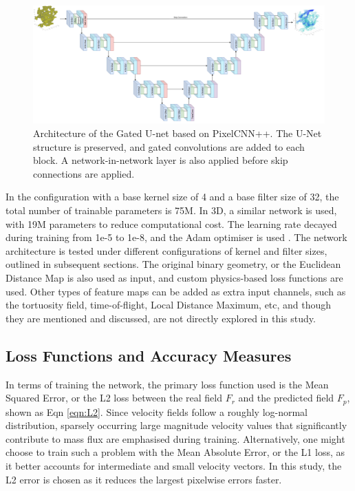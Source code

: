 \documentclass{article}
\begin{document}
\begin{figure}[htp!]
  \centering
    \includegraphics[width=\textwidth]{./figures/velCNNarch.png}
    \caption{Architecture of the Gated U-net based on PixelCNN++. The U-Net structure is preserved, and gated convolutions are added to each block. A network-in-network layer is also applied before skip connections are applied.}
    \label{fig:uresnet3d}
\end{figure}

In the configuration with a base kernel size of 4 and a base filter size of 32, the total number of trainable parameters is 75M. In 3D, a similar network is used, with 19M parameters to reduce computational cost. The learning rate decayed during training from 1e-5 to 1e-8, and the Adam optimiser is used \cite{AdamKingma}. The network architecture is tested under different configurations of kernel and filter sizes, outlined in subsequent sections. The original binary geometry, or the Euclidean Distance Map is also used as input, and custom physics-based loss functions are used. Other types of feature maps can be added as extra input channels, such as the tortuosity field, time-of-flight, Local Distance Maximum, etc, and though they are mentioned and discussed, are not directly explored in this study.

\subsection{Loss Functions and Accuracy Measures}
\label{sec:accuracy}

In terms of training the network, the primary loss function used is the Mean Squared Error, or the L2 loss between the real field $F_{r}$ and the predicted field $F_{p}$, shown as Eqn \ref{eqn:L2}. Since velocity fields follow a roughly log-normal distribution, sparsely occurring large magnitude velocity values that significantly contribute to mass flux are emphasised during training. Alternatively, one might choose to train such a problem with the Mean Absolute Error, or the L1 loss, as it better accounts for intermediate and small velocity vectors. In this study, the L2 error is chosen as it reduces the largest pixelwise errors faster.
\end{document}
